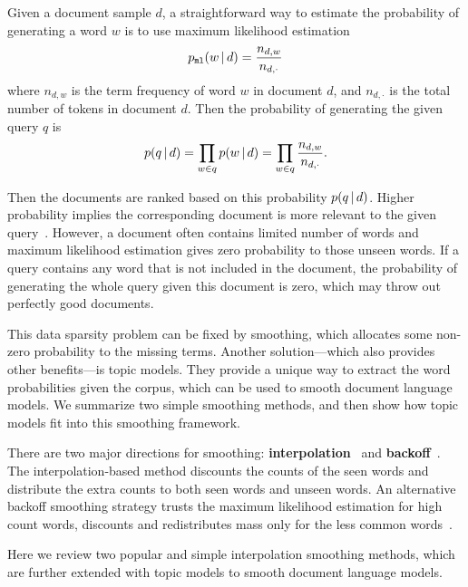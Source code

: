Given a document sample $d$, a straightforward way to estimate the
probability of generating a word $w$ is to use maximum likelihood
estimation
\begin{align}
p_{\texttt{ml}}(w \, | \, d) = \frac{n_{d,w}}{n_{d,\cdot}}
\label{eq:ir_mse}
\end{align}
where $n_{d,w}$ is the term frequency of word $w$ in document $d$, and
$n_{d,\cdot}$ is the total number of tokens in document $d$. Then the
probability of generating the given query $q$ is
\begin{align}
p(q \, | \, d) = \prod_{w \in q} p(w \, | \, d) = \prod_{w \in q} \frac{n_{d,w}}{n_{d,\cdot}}.
\end{align}

Then the documents are ranked based on this probability $p(q \, | \, d)$. Higher
probability implies the corresponding document is more relevant to the
given query~\citep{song-99}. However, a document often contains limited number of words and
maximum likelihood estimation gives zero probability to those unseen words.
If a query contains any word that is not included in the document, the probability
of generating the whole query given this document is zero, which may throw out perfectly good documents.

This data sparsity problem can be fixed by smoothing, which allocates
some non-zero probability to the missing terms.  Another
solution---which also provides other benefits---is topic models.  They
provide a unique way to extract the word probabilities given the
corpus, which can be used to smooth document language models.  We
summarize two simple smoothing methods, and then show how topic models
fit into this smoothing framework.


There are two major directions for smoothing:
\textbf{interpolation}~\citep{Jelinek-1980,mackay95dirichlet,Ney-1994,PonteCroft,zhai-01}
and \textbf{backoff}~\citep{katz-87,song-99}. The interpolation-based
method discounts the counts of the seen words and distribute the extra
counts to both seen words and unseen words. An alternative backoff
smoothing strategy trusts the maximum likelihood estimation for high
count words, discounts and redistributes mass only for the less common
words~\citep{zhai-01}.

Here we review two popular and simple interpolation smoothing
methods, which are further extended with topic models to smooth document
language models.

